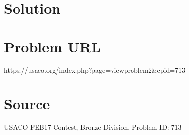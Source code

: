 \documentclass[12pt]{article}
\begin{document}
\section*{Solution}


\section*{Problem URL}
https://usaco.org/index.php?page=viewproblem2&cpid=713

\section*{Source}
USACO FEB17 Contest, Bronze Division, Problem ID: 713
\end{document}
